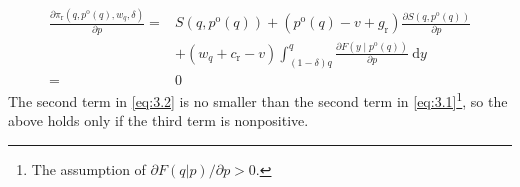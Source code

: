 \begin{align}
\frac{\partial \pi_{\mathrm{r}}\left(q, p^{\mathrm{o}}(q), w_{q}, \delta\right)}{\partial p}=& S\left(q, p^{\mathrm{o}}(q)\right)+\left(p^{\mathrm{o}}(q)-v+g_{\mathrm{r}}\right) \frac{\partial S\left(q, p^{\mathrm{o}}(q)\right)}{\partial p} \nonumber\\
&+\left(w_{q}+c_{\mathrm{r}}-v\right) \int_{(1-\delta) q}^{q} \frac{\partial F\left(y \mid p^{\mathrm{o}}(q)\right)}{\partial p} \mathrm{~d} y \nonumber\\
=& 0\label{eq:3.2}
\end{align}
The second term in \autoref{eq:3.2} is no smaller than the second term in \autoref{eq:3.1}\footnote{The assumption of $\partial F(q|p)/\partial p>0.$}, so the above holds only if the third term is nonpositive. 
